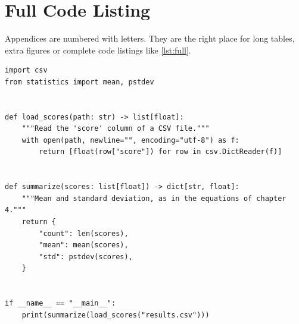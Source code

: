 \chapter{Full Code Listing}
\label{app:listing}

Appendices are numbered with letters. They are the right place for long
tables, extra figures or complete code listings like \cref{lst:full}.

\begin{listing}[H]
  \begin{verbatim}
import csv
from statistics import mean, pstdev


def load_scores(path: str) -> list[float]:
    """Read the 'score' column of a CSV file."""
    with open(path, newline="", encoding="utf-8") as f:
        return [float(row["score"]) for row in csv.DictReader(f)]


def summarize(scores: list[float]) -> dict[str, float]:
    """Mean and standard deviation, as in the equations of chapter 4."""
    return {
        "count": len(scores),
        "mean": mean(scores),
        "std": pstdev(scores),
    }


if __name__ == "__main__":
    print(summarize(load_scores("results.csv")))
  \end{verbatim}
  \caption{A complete script.}
  \label{lst:full}
\end{listing}
